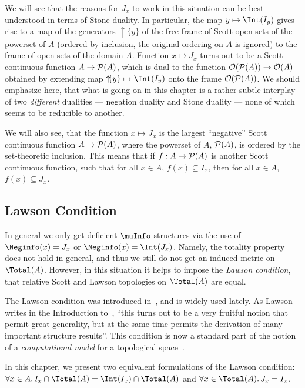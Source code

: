 We will see that the reasons for $J_x$ to work in this situation
can be best understood in terms of Stone duality.
In particular,
the map $y \mapsto \Int(I_y)$ gives rise to a map of the generators
$\uparrow\!\!\!\{y\}$
of the free frame of Scott open sets of the powerset of $A$ (ordered by
inclusion, the original ordering on $A$ is ignored) to the frame
of open sets of the domain $A$. 
Function $x \mapsto J_x$ turns out to be a Scott continuous function
$A \rightarrow {\cal P}(A)$, which is dual to the function
${\cal O}({\cal P}(A)) \rightarrow {\cal O}(A)$ obtained by extending
map $\uparrow\!\!\!\{y\} \mapsto \Int(I_y)$ onto the frame
${\cal O}({\cal P}(A))$.
We should emphasize here, that
what is going on in this chapter is a rather subtle interplay of
two {\em different} dualities --- negation duality and Stone duality ---
none of which seems to be reducible to another.

We will also see, that the function $x \mapsto J_x$ is the
largest ``negative'' Scott continuous function $A \rightarrow {\cal P}(A)$,
where the powerset of $A$, ${\cal P}(A)$, is ordered by the set-theoretic
inclusion.
This means that if $f: A \rightarrow {\cal P}(A)$ is
another Scott continuous function, 
such that for all $x \in A$, $f(x) \subseteq I_x$,
then for all $x \in A$, $f(x) \subseteq J_x$.

\subsection{Lawson Condition}

In general we only get deficient $\muInfo$-structures via the use of
$\Neginfo(x) = J_x$ or $\Neginfo(x) = \Int(J_x)$.
Namely, the totality property does not hold in general,
and thus we still do not get an induced metric on $\Total(A)$.
However, in this situation it helps to impose the {\em Lawson
condition}, that relative Scott and Lawson topologies
on $\Total(A)$ are equal. 

The Lawson condition was introduced in~\cite{Lawson}, and is
widely used lately. As Lawson writes in the
Introduction to~\cite{Lawson}, ``this turns out to be a very fruitful
notion that permit great generality, but at the same time permits
the derivation of many important structure results''. 
This condition is now a standard part of the notion of
a {\em computational model} for a topological space~\cite{Flagg}.

In this chapter, we present two equivalent formulations of the
Lawson condition: $\forall x \in A.\, I_x \cap \Total(A) =
\Int(I_x) \cap \Total(A)$ and $\forall x \in \Total(A).\, J_x = I_x$.

